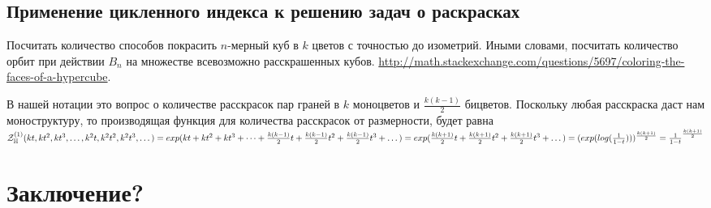 \subsection{Применение цикленного индекса к решению задач о раскрасках}
\begin{problem}
Посчитать количество способов покрасить $n$-мерный куб в $k$ цветов с точностью
до изометрий. Иными словами, посчитать количество орбит при действии $B_n$ на
множестве всевозможно расскрашенных кубов. \url{http://math.stackexchange.com/questions/5697/coloring-the-faces-of-a-hypercube}.
\end{problem}
\begin{solution}
В нашей нотации это вопрос о количестве расскрасок пар граней в $k$ моноцветов и
$\frac{k(k-1)}{2}$ бицветов. Поскольку любая расскраска даст нам моноструктуру,
то производящая функция для количества расскрасок от размерности, будет равна
$\mathcal Z^{(1)}_{\mathbb H}(kt, kt^2, kt^3, \dots, k^2t,
k^2t^2, k^2t^3, \dots) = exp(kt + kt^2 + kt^3 + \dots
+ \frac{k(k-1)}{2}t + \frac{k(k-1)}{2}t^2 + \frac{k(k-1)}{2}t^3 + \dots) =
exp(\frac{k(k+1)}{2}t + \frac{k(k+1)}{2}t^2 + \frac{k(k+1)}{2}t^3 + \dots) =
(exp(log(\frac{1}{1-t})))^{\frac{k(k+1)}{2}} = \frac{1}{1-t}^{\frac{k(k+1)}{2}}$
\end{solution}

\section{Заключение?}
